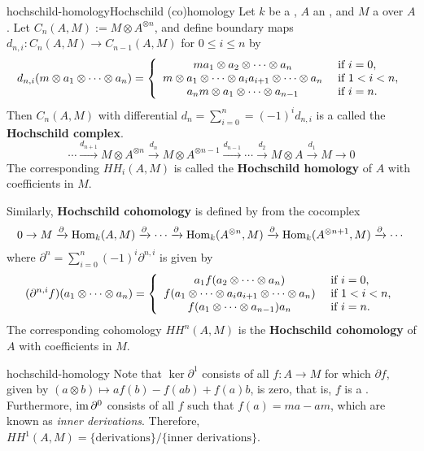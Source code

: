 \begin{topic}{hochschild-homology}{Hochschild (co)homology}
    Let $k$ be a , $A$ an , and $M$ a  over $A$. Let $C_n(A, M) := M \otimes A^{\otimes n}$, and define boundary maps $d_{n, i} : C_n(A, M) \to C_{n - 1}(A, M)$ for $0 \le i \le n$ by
    \[ d_{n, i}(m \otimes a_1 \otimes \cdots \otimes a_n) = \left\{ \begin{array}{cl}
        m a_1 \otimes a_2 \otimes \cdots \otimes a_n & \textup{ if } i = 0, \\
         m \otimes a_1 \otimes \cdots \otimes a_i a_{i + 1} \otimes \cdots \otimes a_n & \textup{ if } 1 < i < n , \\
        a_n m \otimes a_1 \otimes \cdots \otimes a_{n - 1} & \textup{ if } i = n .
    \end{array} \right. \]
    Then $C_n(A, M)$ with differential $d_n = \sum_{i = 0}^{n} = (-1)^i d_{n, i}$ is a  called the \textbf{Hochschild complex}.
    \[ \cdots \xrightarrow{d_{n + 1}} M \otimes A^{\otimes n} \xrightarrow{d_n} M \otimes A^{\otimes n - 1} \xrightarrow{d_{n - 1}} \cdots \xrightarrow{d_2} M \otimes A \xrightarrow{d_1} M \to 0 \]
    The corresponding  $HH_i(A, M)$ is called the \textbf{Hochschild homology} of $A$ with coefficients in $M$.
    
    Similarly, \textbf{Hochschild cohomology} is defined by from the cocomplex
    \[ 0 \to M \xrightarrow{\partial} \operatorname{Hom}_k(A, M) \xrightarrow{\partial} \cdots \xrightarrow{\partial} \operatorname{Hom}_k(A^{\otimes n}, M) \xrightarrow{\partial} \operatorname{Hom}_k(A^{\otimes n + 1}, M) \xrightarrow{\partial} \cdots \]
    where $\partial^n = \sum_{i = 0}^n (-1)^i \partial^{n, i}$ is given by
    \[ (\partial^{n, i} f)(a_1 \otimes \cdots \otimes a_n) = \left\{ \begin{array}{cl}
        a_1 f(a_2 \otimes \cdots \otimes a_n)  & \textup{ if } i = 0, \\
         f(a_1 \otimes \cdots \otimes a_i a_{i + 1} \otimes \cdots \otimes a_n) & \textup{ if } 1 < i < n, \\
        f(a_1 \otimes \cdots \otimes a_{n - 1}) a_n & \textup{ if } i = n .
    \end{array} \right. \]
    The corresponding cohomology $HH^n(A, M)$ is the \textbf{Hochschild cohomology} of $A$ with coefficients in $M$.
\end{topic}

\begin{example}{hochschild-homology}
    Note that $\ker \partial^1$ consists of all $f : A \to M$ for which $\partial f$, given by $(a \otimes b) \mapsto a f(b) - f(ab) + f(a) b$, is zero, that is, $f$ is a . Furthermore, $\operatorname{im} \partial^0$ consists of all $f$ such that $f(a) = ma - am$, which are known as \textit{inner derivations}. Therefore, $HH^1(A, M) = \{ \text{derivations} \} / \{ \text{inner derivations} \}$.
\end{example}

